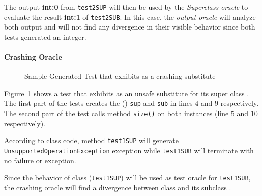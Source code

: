 The output \textbf{int:0} from \texttt{test2SUP} will then be used
by the \textit{Superclass oracle} to evaluate the result \textbf{int:1}
of \texttt{test2SUB}.
In this case, the \textit{output oracle} will analyze both output and will
not find any divergence in their visible behavior since both tests
generated an integer.

\paragraph*{Crashing Oracle}
\begin{figure}[!ht]
\caption{Sample Generated Test that exhibits \myB{} as a crashing substitute}
\label{fig:divergence}
\end{figure}

Figure~\ref{fig:divergence} shows a test that exhibits \myB{}
as an unsafe substitute for its super class \myA{}.
The first part of the tests creates the (\myout{}) \texttt{sup}
and \texttt{sub} in lines $4$ and $9$ respectively.
The second part of the test calls method \texttt{size()} on
both instances (line $5$ and $10$ respectively).

According to class \myA{} code, method \texttt{test1SUP} will
generate \texttt{UnsupportedOperationException} exception while
\texttt{test1SUB} will terminate with no failure or exception.

Since the behavior of class \myA{} (\texttt{test1SUP}) will be
used as test oracle for \texttt{test1SUB}, the crashing oracle will
find a divergence between class \myA{} and its subclass \myB{}.